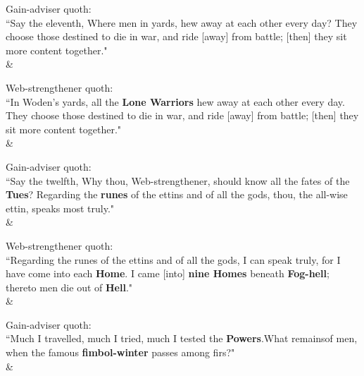 \begin{Rightside}
\begin{astanza}%
\bv Gain-adviser quoth: \\ “Say the eleventh, Where men in yards, hew away at each other every day? They choose those destined to die in war, and ride [away] from battle; [then] they sit more content together." \\
\&\end{astanza}%

\begin{astanza}%
\bv Web-strengthener quoth: \\ “In Woden's yards, all the \textbf{Lone Warriors} hew away at each other every day. They choose those destined to die in war, and ride [away] from battle; [then] they sit more content together." \\
\&\end{astanza}%

\begin{astanza}%
\bv Gain-adviser quoth: \\ “Say the twelfth, Why thou, Web-strengthener, should know all the fates of the \textbf{Tues}\footnotemark[73]? Regarding the \textbf{runes} of the ettins and of all the gods, thou, the all-wise ettin, speaks most truly." \\
\&\end{astanza}%

\begin{astanza}%
\bv Web-strengthener quoth: \\ “Regarding the runes of the ettins and of all the gods, I can speak truly, for I have come into each \textbf{Home}. I came [into] \textbf{nine Homes} beneath \textbf{Fog-hell}; thereto men die out of \textbf{Hell}\footnotemark[75]." \\
\&\end{astanza}%

\begin{astanza}%
\bv Gain-adviser quoth: \\ “Much I travelled, much I tried, much I tested the \textbf{Powers}.\footnotemark[80] What remains\footnotemark[79] of men, when the famous \textbf{fimbol-winter} passes among firs\footnotemark[81]?" \\
\&\end{astanza}%


\end{Rightside}
